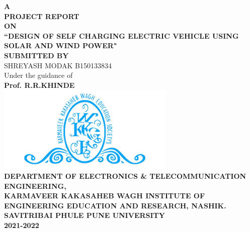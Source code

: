 \documentclass[a4paper,12pt]{article}
\begin{document}
\begin{center}
\Large\textbf{\scshape A}\\
\Large\textbf{\scshape PROJECT REPORT}\\
\Large\textbf{\scshape ON}\\[1.5cm]
\vspace{0.1in}
\LARGE\textbf{“DESIGN OF SELF CHARGING ELECTRIC VEHICLE USING SOLAR AND WIND POWER"}\\[1.5cm]
\large\textbf{SUBMITTED BY}\\[1cm] 
SHREYASH MODAK \hspace{7.5cm} B150133834\\[1cm]
Under the guidance of\\[0.16cm]
\Large\textbf{Prof. R.R.KHINDE}\\[0.5cm]
\includegraphics[scale=0.5]{logo.jpg}\\
\Large\textbf{\scshape DEPARTMENT OF ELECTRONICS \& TELECOMMUNICATION ENGINEERING,}\\[0.75cm]
\Large\scshape\textbf{\scshape KARMAVEER KAKASAHEB WAGH INSTITUTE OF ENGINEERING EDUCATION AND RESEARCH, NASHIK.}\\[0.75cm]
\Large\textbf{\scshape SAVITRIBAI PHULE PUNE UNIVERSITY}\\[0.75cm]
\Large\textbf{\scshape 2021-2022}\\
\end{center}
\end{document}
